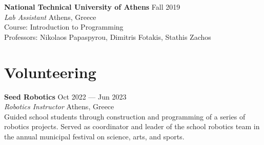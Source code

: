 \documentclass[margin, 12pt]{resume}
\newcommand{\pash}{\textsc{PaSh}}
\newcommand{\sectionVSpace}{\vspace{-3.5ex}} %
\newcommand{\splash}{\textsc{SPLaSh}\xspace}
\newcommand{\competition}[1]{\textbf{#1}\xspace}
\newcommand{\event}[1]{\textit{#1}\xspace}
\newcommand{\institution}[1]{\textbf{#1}\xspace}
\newcommand{\ordinal}[1]{\textsuperscript{#1}\xspace}
\newcommand{\rSection}[1]{\sectionVSpace\section{#1}\xspace}
\newcommand{\role}[1]{\textit{#1}\xspace}
\newcommand{\stitle}[1]{#1:\xspace}
\newcommand{\talk}[1]{\textbf{#1}\xspace}
\begin{document}
\begin{resume}
    \institution{National Technical University of Athens} \hfill Fall 2019 \\
    \role{Lab Assistant} \hfill Athens, Greece \\
    \stitle{Course} Introduction to Programming \\
    \stitle{Professors} Nikolaos Papaspyrou, Dimitris Fotakis, Stathis Zachos \\

    \rSection{Volunteering}

    \institution{Seed Robotics} \hfill Oct 2022 --- Jun 2023 \\
    \role{Robotics Instructor} \hfill Athens, Greece \\
    Guided school students through construction and programming of a series of robotics projects. Served as coordinator and leader of the school robotics team in the annual municipal festival on science, arts, and sports. \\










\end{resume}
\end{document}
